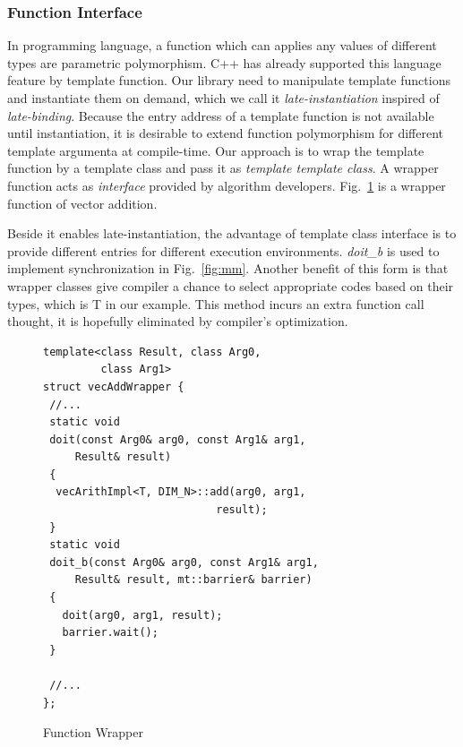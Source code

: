 \documentclass[10pt, conference, compsocconf]{IEEEtran}
\begin{document}
\subsubsection{Function Interface}\label{section:interface}
In programming language, a function which can applies any values of
different types are parametric polymorphism. C++ has already supported
this language feature by template function. Our library need to
manipulate template functions and instantiate them on demand, which we
call it \emph{late-instantiation} inspired of
\emph{late-binding}. Because the entry address of a template function is not available until instantiation, it is desirable to extend function
polymorphism for different template argumenta  at compile-time. Our
approach is to wrap the template function by a template class and pass
it as \emph{template template class}. A wrapper function acts
as \emph{interface} provided by algorithm developers. Fig.~\ref{lst:wrapper} is a wrapper function of vector addition. 

Beside it enables late-instantiation, the advantage of template class interface
is to provide different entries for different execution environments. \emph{doit\_b} is
used to implement synchronization in Fig.~\ref{fig:mm}.  Another benefit of
this form is that wrapper classes  give compiler a chance to select
appropriate codes based on their types, which is T in our example. This method incurs an extra function call  thought, it is hopefully  eliminated by
compiler's optimization.

\begin{figure}[!htp]
\begin{minipage}[tb]{\linewidth}
\makebox[\textwidth]{\hrulefill}
\begin{small}
\begin{verbatim}
template<class Result, class Arg0, 
         class Arg1>
struct vecAddWrapper {
 //...
 static void 
 doit(const Arg0& arg0, const Arg1& arg1, 
     Result& result)
 {
  vecArithImpl<T, DIM_N>::add(arg0, arg1, 
                           result);
 }
 static void 
 doit_b(const Arg0& arg0, const Arg1& arg1, 
     Result& result, mt::barrier& barrier)
 {
   doit(arg0, arg1, result);
   barrier.wait();
 }

 //...
};
\end{verbatim}
\end{small}
\makebox[\textwidth]{\hrulefill}
\end{minipage}
\caption{Function Wrapper}\label{lst:wrapper}
\end{figure}
\end{document}
